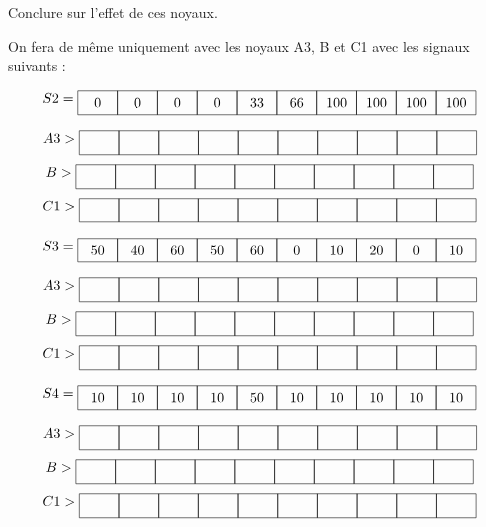 \documentclass[a4paper,11pt,twoside]{book} %
\newcommand{\signal}[1]{ 
	\begin{tikzpicture}[baseline=(current bounding box.center)] \foreach \val [count=\i] in {#1} { \draw (\i-1,0) rectangle (\i,0.6); \node at (\i-.5,.3) {\val}; } \end{tikzpicture} }
\begin{document}
Conclure sur l'effet de ces noyaux.

\medskip

On fera de même uniquement avec les noyaux A3, B et C1 avec les signaux suivants :

$$ S2 = \signal{0, 0, 0, 0, 33, 66, 100, 100, 100, 100} $$

$$ A3 > \signal{ , , , , , , , , , } $$
$$ B > \signal{ , , , , , , , , , } $$
$$ C1 > \signal{ , , , , , , , , , } $$

\medskip

$$ S3 = \signal{50, 40, 60, 50, 60, 0, 10, 20, 0, 10} $$

$$ A3 > \signal{ , , , , , , , , , } $$
$$ B > \signal{ , , , , , , , , , } $$
$$ C1 > \signal{ , , , , , , , , , } $$

\medskip

$$ S4 = \signal{10, 10, 10, 10, 50, 10, 10, 10, 10, 10} $$

$$ A3 > \signal{ , , , , , , , , , } $$
$$ B > \signal{ , , , , , , , , , } $$
$$ C1 > \signal{ , , , , , , , , , } $$

\end{document}
